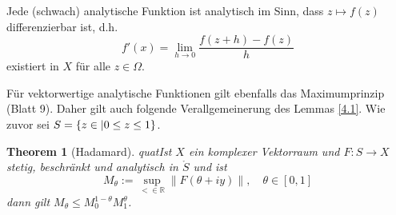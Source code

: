 \documentclass[
paper=a4,
bibtotocnumbered,
liststotocnumbered,
tablecaptionabove,
pointlessnumbers,
twoside,
openright,
10pt
]
{report}
\let\Re\relax\let\Im\relax
\DeclareMathOperator{\Re}{Re}
\DeclareMathOperator{\Im}{Im}
\newtheorem{thm}{Theorem}[chapter]
\theoremstyle{definition}
\numberwithin{equation}{chapter}
\begin{document}
Jede (schwach) analytische Funktion ist analytisch im Sinn, dass $z\mapsto f(z)$ differenzierbar ist, d.h. 
\begin{equation}
f'(x) = \lim_{h\to 0} \frac{f(z+h)-f(z)}{h}
\end{equation}
existiert in $X$ für alle $z\in \mathbb \Omega$.

Für vektorwertige analytische Funktionen gilt ebenfalls das Maximumprinzip (Blatt 9). Daher gilt auch folgende Verallgemeinerung des Lemmas \ref{4.1}. Wie zuvor sei $S=\{z\in \mathbb | 0 \le \Re z \le 1\}$.

\begin{thm}[Hadamard]
quatIst $X$ ein komplexer Vektorraum und $F: S \to X$ stetig, beschränkt und analytisch in $\mathring S$ und ist
\begin{equation}
M_{\theta} := \sup_{<\in \mathbb R} \| F(\theta+iy)\|, \quad \theta\in [0,1]
\end{equation}
dann gilt $M_\theta \le M_0^{1-\theta} M_1^\theta$.
\end{thm}
\end{document}
